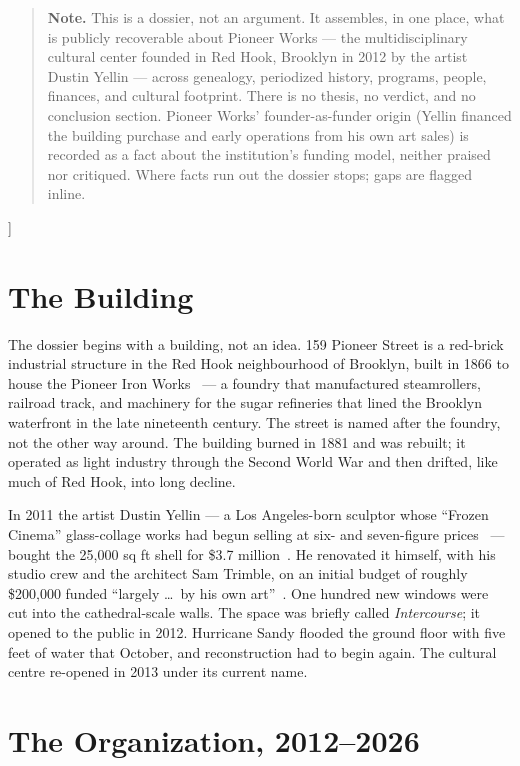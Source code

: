 \documentclass[10pt,letterpaper,twocolumn]{article}
\begin{document}
{\begin{quote}
\small\noindent\textbf{Note.} This is a dossier, not an argument. It assembles, in one place, what is publicly recoverable about Pioneer Works --- the multidisciplinary cultural center founded in Red Hook, Brooklyn in 2012 by the artist Dustin Yellin --- across genealogy, periodized history, programs, people, finances, and cultural footprint. There is no thesis, no verdict, and no conclusion section. Pioneer Works' founder-as-funder origin (Yellin financed the building purchase and early operations from his own art sales) is recorded as a fact about the institution's funding model, neither praised nor critiqued. Where facts run out the dossier stops; gaps are flagged inline.
\end{quote}
\vspace{0.5em}
}]

\section{The Building}

The dossier begins with a building, not an idea. 159 Pioneer Street is a red-brick industrial structure in the Red Hook neighbourhood of Brooklyn, built in 1866 to house the Pioneer Iron Works~\citep{wikipedia2026pioneer} --- a foundry that manufactured steamrollers, railroad track, and machinery for the sugar refineries that lined the Brooklyn waterfront in the late nineteenth century. The street is named after the foundry, not the other way around. The building burned in 1881 and was rebuilt; it operated as light industry through the Second World War and then drifted, like much of Red Hook, into long decline.

In 2011 the artist Dustin Yellin --- a Los Angeles-born sculptor whose ``Frozen Cinema'' glass-collage works had begun selling at six- and seven-figure prices~\citep{wikipedia2026yellin} --- bought the 25{,}000 sq ft shell for \$3.7 million~\citep{bkmag2022pioneer}. He renovated it himself, with his studio crew and the architect Sam Trimble, on an initial budget of roughly \$200{,}000 funded ``largely \dots\ by his own art''~\citep{fvf2017pioneer}. One hundred new windows were cut into the cathedral-scale walls. The space was briefly called \emph{Intercourse}; it opened to the public in 2012. Hurricane Sandy flooded the ground floor with five feet of water that October, and reconstruction had to begin again. The cultural centre re-opened in 2013 under its current name.

\section{The Organization, 2012--2026}
\end{document}
